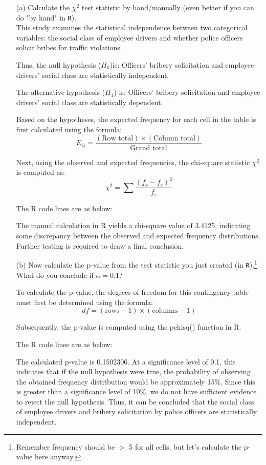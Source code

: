 \documentclass[12pt,letterpaper]{article}
\begin{document}
	\begin{enumerate}
		\item [(a)] Calculate the $\chi^2$ test statistic by hand/manually (even better if you can do "by hand" in \texttt{R}).\\
		This study examines the statistical independence between two categorical variables: the social class of employee drivers and whether police officers solicit bribes for traffic violations.
		
		Thus, the null hypothesis ($H_0$)is:
		Officers' bribery solicitation and employee drivers' social class are statistically independent.
		
		The alternative hypothesis ($H_1$) is:
		Officers' bribery solicitation and employee drivers' social class are statistically dependent.
		
		Based on the hypotheses, the expected frequency for each cell in the table is first calculated using the formula:
		\[
		E_{ij} = \frac{(\text{Row total}) \times (\text{Column total})}{\text{Grand total}}
		\]
		
		Next, using the observed and expected frequencies, the chi-square statistic $\chi^2$ is computed as:
		\[
		\chi^2 = \sum \frac{(f_o - f_e)^2}{f_e}
		\]
		
		The R code lines are as below:
		
		
		The manual calculation in R yields a chi-square value of 3.4125, indicating some discrepancy between the observed and expected frequency distributions. Further testing is required to draw a final conclusion.
		
		\item [(b)] Now calculate the p-value from the test statistic you just created (in \texttt{R}).\footnote{Remember frequency should be $>$ 5 for all cells, but let's calculate the p-value here anyway.} What do you conclude if $\alpha = 0.1$?
		
		To calculate the p-value, the degrees of freedom for this contingency table must first be determined using the formula:
		\[
		df = (\text{rows} - 1) \times (\text{columns} - 1)
		\]
		
		Subsequently, the p-value is computed using the pchisq() function in R.
		
		The R code lines are as below:
		
		
		The calculated p-value is 0.1502306. At a significance level of 0.1, this indicates that if the null hypothesis were true, the probability of observing the obtained frequency distribution would be approximately 15\%. Since this is greater than a significance level of 10\%, we do not have sufficient evidence to reject the null hypothesis. Thus, it can be concluded that the social class of employee drivers and bribery solicitation by police officers are statistically independent.
		

\end{enumerate}
\end{document}
